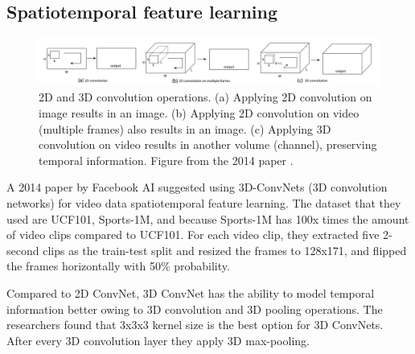 \subsection{Spatiotemporal feature learning}

\begin{figure}
    \centering
    \includegraphics[width=1\textwidth]{images/video_synthesis/conv.png}
    \caption{2D and 3D convolution operations. (a) Applying 2D convolution on image results in an image. (b) Applying 2D convolution on video (multiple frames) also results in an image. (c) Applying 3D convolution on video results in another volume (channel), preserving temporal information. Figure from the 2014 paper \cite{tran2015learning}.}
\end{figure}

A 2014 paper \cite{tran2015learning} by Facebook AI suggested using 3D-ConvNets (3D convolution networks) for video data spatiotemporal feature learning. The dataset that they used are UCF101, Sports-1M, and because Sports-1M has 100x times the amount of video clips compared to UCF101. For each video clip, they extracted five 2-second clips as the train-test split and resized the frames to 128x171, and flipped the frames horizontally with 50\% probability.

Compared to 2D ConvNet, 3D ConvNet has the ability to model temporal information better owing to 3D convolution and 3D pooling operations. The researchers found that 3x3x3 kernel size is the best option for 3D ConvNets. After every 3D convolution layer they apply 3D max-pooling.

